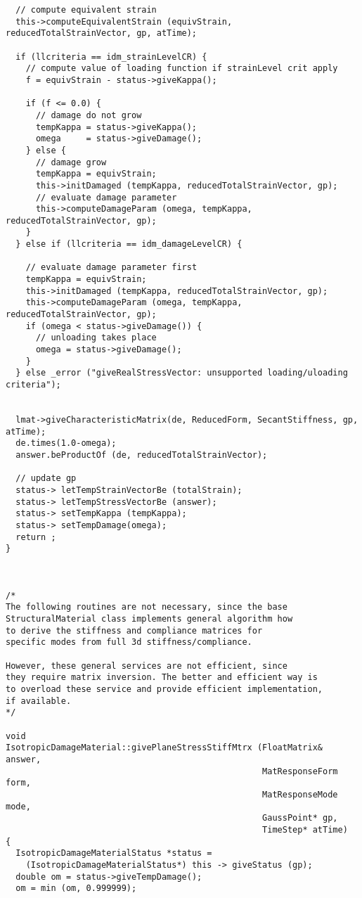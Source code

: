 \documentclass[12pt,draft]{article}
\begin{document}
{\begin{verbatim}
  // compute equivalent strain
  this->computeEquivalentStrain (equivStrain, reducedTotalStrainVector, gp, atTime);

  if (llcriteria == idm_strainLevelCR) {
    // compute value of loading function if strainLevel crit apply
    f = equivStrain - status->giveKappa();

    if (f <= 0.0) {
      // damage do not grow
      tempKappa = status->giveKappa();
      omega     = status->giveDamage();
    } else {
      // damage grow
      tempKappa = equivStrain;
      this->initDamaged (tempKappa, reducedTotalStrainVector, gp);
      // evaluate damage parameter
      this->computeDamageParam (omega, tempKappa, reducedTotalStrainVector, gp);
    }
  } else if (llcriteria == idm_damageLevelCR) {

    // evaluate damage parameter first
    tempKappa = equivStrain;
    this->initDamaged (tempKappa, reducedTotalStrainVector, gp);
    this->computeDamageParam (omega, tempKappa, reducedTotalStrainVector, gp);
    if (omega < status->giveDamage()) {
      // unloading takes place
      omega = status->giveDamage();
    }
  } else _error ("giveRealStressVector: unsupported loading/uloading criteria");


  lmat->giveCharacteristicMatrix(de, ReducedForm, SecantStiffness, gp, atTime);
  de.times(1.0-omega);
  answer.beProductOf (de, reducedTotalStrainVector);

  // update gp
  status-> letTempStrainVectorBe (totalStrain);
  status-> letTempStressVectorBe (answer);
  status-> setTempKappa (tempKappa);
  status-> setTempDamage(omega);
  return ;
}



/*
The following routines are not necessary, since the base
StructuralMaterial class implements general algorithm how
to derive the stiffness and compliance matrices for
specific modes from full 3d stiffness/compliance.

However, these general services are not efficient, since
they require matrix inversion. The better and efficient way is
to overload these service and provide efficient implementation,
if available.
*/

void 
IsotropicDamageMaterial::givePlaneStressStiffMtrx (FloatMatrix& answer, 
                                                   MatResponseForm form, 
                                                   MatResponseMode mode,
                                                   GaussPoint* gp, 
                                                   TimeStep* atTime)
{
  IsotropicDamageMaterialStatus *status = 
    (IsotropicDamageMaterialStatus*) this -> giveStatus (gp);
  double om = status->giveTempDamage();
  om = min (om, 0.999999);


\end{verbatim}}
\end{document}

